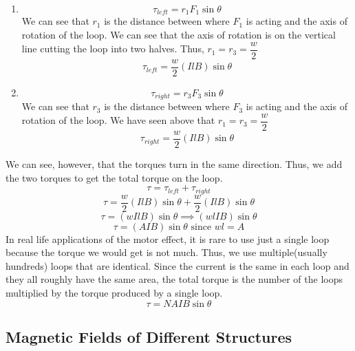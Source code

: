 \documentclass[9pt]{article}
\begin{document}
		\begin{enumerate}
			\item $$\tau_{left}=r_1F_1\sin\theta$$
			We can see that $r_1$ is the distance between where $F_1$ is acting and the axis of rotation of the loop. We can see that the axis of rotation is on the vertical line cutting the loop into two halves. Thus, $r_1=r_3=\dfrac{w}{2}$
			$$\tau_{left}=\dfrac{w}{2}(IlB)\sin\theta$$
			\item $$\tau_{right}=r_3F_3\sin\theta$$
			We can see that $r_3$ is the distance between where $F_3$ is acting and the axis of rotation of the loop. We have seen above that $r_1=r_3=\dfrac{w}{2}$
			$$\tau_{right}=\dfrac{w}{2}(IlB)\sin\theta$$
		\end{enumerate}
		We can see, however, that the torques turn in the same direction. Thus, we add the two torques to get the total torque on the loop.
		$$\tau=\tau_{left}+\tau_{right}$$
		$$\tau=\dfrac{w}{2}(IlB)\sin\theta+\dfrac{w}{2}(IlB)\sin\theta$$
		$$\tau=(wIlB)\sin\theta\implies(wlIB)\sin\theta$$
		$$\tau=(AIB)\sin\theta\text{ since } wl=A$$
		In real life applications of the motor effect, it is rare to use just a single loop because the torque we would get is not much. Thus, we use multiple(usually hundreds) loops that are identical. Since the current is the same in each loop and they all roughly have the same area, the total torque is the number of the loops multiplied by the torque produced by a single loop.
		$$\tau=NAIB\sin\theta$$ 
		\subsection*{Magnetic Fields of Different Structures}
\end{document}
